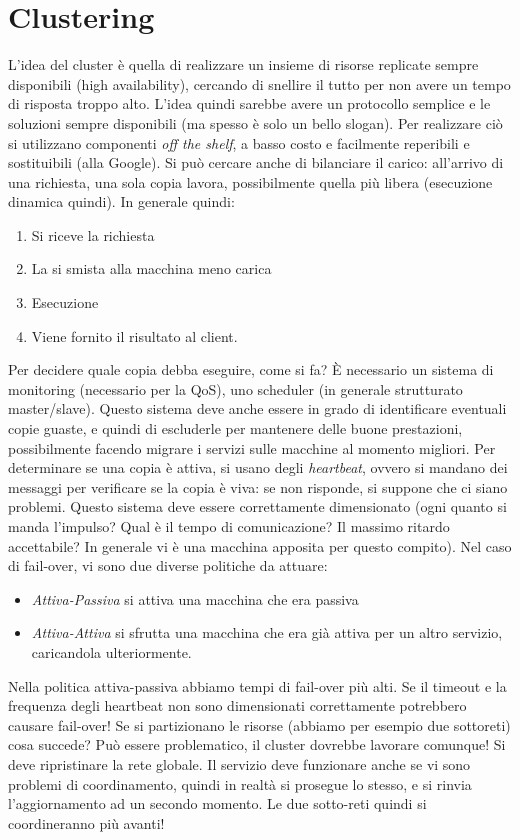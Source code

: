 \section{Clustering}
L'idea del cluster è quella di realizzare un insieme di risorse replicate 
sempre disponibili (high availability),
cercando di snellire il tutto per non avere un tempo di risposta troppo alto. 
L'idea quindi sarebbe avere un protocollo
semplice e le soluzioni sempre disponibili (ma spesso è solo un bello slogan).
Per realizzare ciò si utilizzano componenti \textit{off the shelf}, a basso 
costo e facilmente reperibili e
sostituibili (alla Google). Si può cercare anche di bilanciare il carico: 
all'arrivo di una richiesta, una sola copia
lavora, possibilmente quella più libera (esecuzione dinamica quindi). In 
generale quindi:
\begin{enumerate}
 \item Si riceve la richiesta
 \item La si smista alla macchina meno carica
 \item Esecuzione
 \item Viene fornito il risultato al client.
\end{enumerate}
Per decidere quale copia debba eseguire, come si fa? È necessario un sistema di 
monitoring (necessario per la QoS),
uno scheduler (in generale strutturato master/slave). Questo sistema deve anche 
essere in grado di identificare
eventuali copie guaste, e quindi di escluderle per mantenere delle buone 
prestazioni, possibilmente facendo migrare i
servizi sulle macchine al momento migliori. Per determinare se una copia è 
attiva, si usano degli \textit{heartbeat},
ovvero si mandano dei messaggi per verificare se la copia è viva: se non 
risponde, si suppone che ci siano problemi.
Questo sistema deve essere correttamente dimensionato (ogni quanto si manda 
l'impulso? Qual è il tempo di
comunicazione? Il massimo ritardo accettabile? In generale vi è una macchina 
apposita per questo compito).
Nel caso di fail-over, vi sono due diverse politiche da attuare:
\begin{itemize}
 \item \textit{Attiva-Passiva} si attiva una macchina che era passiva
 \item \textit{Attiva-Attiva} si sfrutta una macchina che era già attiva
 per un altro servizio, caricandola ulteriormente.
\end{itemize}
Nella politica attiva-passiva abbiamo tempi di fail-over più alti.
Se il timeout e la frequenza degli heartbeat non sono dimensionati
correttamente potrebbero causare fail-over!
Se si partizionano le risorse (abbiamo per esempio due sottoreti) cosa succede? 
Può essere problematico, il cluster
dovrebbe lavorare comunque! Si deve ripristinare la rete globale. Il servizio 
deve funzionare anche se vi sono problemi
di coordinamento, quindi in realtà si prosegue lo stesso, e si rinvia 
l'aggiornamento ad un secondo momento. Le due
sotto-reti quindi si coordineranno più avanti!
